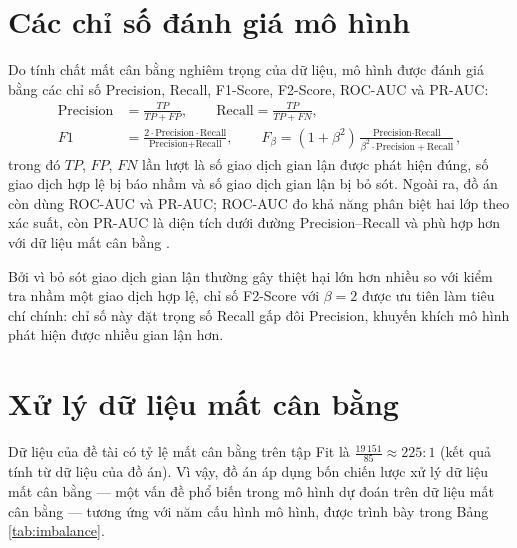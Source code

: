 \section{Các chỉ số đánh giá mô hình}
Do tính chất mất cân bằng nghiêm trọng của dữ liệu, mô hình được đánh giá bằng các chỉ số Precision, Recall, F1-Score, F2-Score, ROC-AUC và PR-AUC:
\begin{align*}
\text{Precision} &= \frac{TP}{TP + FP}, \qquad
\text{Recall} = \frac{TP}{TP + FN}, \\
F1 &= \frac{2 \cdot \text{Precision} \cdot \text{Recall}}{\text{Precision} + \text{Recall}}, \qquad
F_\beta = (1 + \beta^2)\frac{\text{Precision} \cdot \text{Recall}}{\beta^2 \cdot \text{Precision} + \text{Recall}},
\end{align*}
trong đó $TP$, $FP$, $FN$ lần lượt là số giao dịch gian lận được phát hiện đúng, số giao dịch hợp lệ bị báo nhầm và số giao dịch gian lận bị bỏ sót. Ngoài ra, đồ án còn dùng ROC-AUC và PR-AUC; ROC-AUC đo khả năng phân biệt hai lớp theo xác suất, còn PR-AUC là diện tích dưới đường Precision--Recall và phù hợp hơn với dữ liệu mất cân bằng \cite{davis2006pr}.

Bởi vì bỏ sót giao dịch gian lận thường gây thiệt hại lớn hơn nhiều so với kiểm tra nhầm một giao dịch hợp lệ, chỉ số F2-Score với $\beta = 2$ được ưu tiên làm tiêu chí chính: chỉ số này đặt trọng số Recall gấp đôi Precision, khuyến khích mô hình phát hiện được nhiều gian lận hơn.

\section{Xử lý dữ liệu mất cân bằng}
Dữ liệu của đề tài có tỷ lệ mất cân bằng trên tập Fit là $\frac{19\,151}{85} \approx 225{:}1$ (kết quả tính từ dữ liệu của đồ án). Vì vậy, đồ án áp dụng bốn chiến lược xử lý dữ liệu mất cân bằng — một vấn đề phổ biến trong mô hình dự đoán trên dữ liệu mất cân bằng \cite{branco2016survey} — tương ứng với năm cấu hình mô hình, được trình bày trong Bảng \ref{tab:imbalance}.

